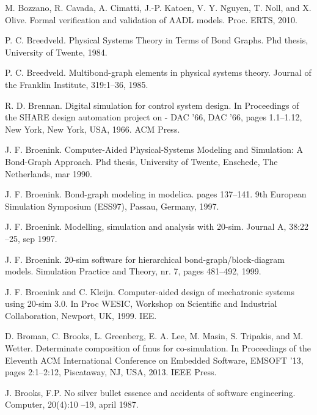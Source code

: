 \begin{description}[style=nextline,leftmargin=12mm,labelwidth=10mm,font=\normalfont]
\item[{[42]}] M. Bozzano, R. Cavada, A. Cimatti, J.-P. Katoen, V. Y. Nguyen, T. Noll, and X. Olive. Formal verification and validation of AADL models. Proc. ERTS, 2010.

\item[{[43]}] P. C. Breedveld. Physical Systems Theory in Terms of Bond Graphs. Phd thesis, University of Twente, 1984.

\item[{[44]}] P. C. Breedveld. Multibond-graph elements in physical systems theory. Journal of the Franklin Institute, 319:1–36, 1985.

\item[{[45]}] R. D. Brennan. Digital simulation for control system design. In Proceedings of the SHARE design automation project on - DAC ’66, DAC ’66, pages 1.1–1.12, New York, New York, USA, 1966. ACM Press.

\item[{[46]}] J. F. Broenink. Computer-Aided Physical-Systems Modeling and Simulation: A Bond-Graph Approach. Phd thesis, University of Twente, Enschede, The Netherlands, mar 1990.

\item[{[47]}] J. F. Broenink. Bond-graph modeling in modelica. pages 137–141. 9th European Simulation Symposium (ESS97), Passau, Germany, 1997.

\item[{[48]}] J. F. Broenink. Modelling, simulation and analysis with 20-sim. Journal A, 38:22 –25, sep 1997.

\item[{[49]}] J. F. Broenink. 20-sim software for hierarchical bond-graph/block-diagram models. Simulation Practice and Theory, nr. 7, pages 481–492, 1999.

\item[{[50]}] J. F. Broenink and C. Kleijn. Computer-aided design of mechatronic systems using 20-sim 3.0. In Proc WESIC, Workshop on Scientific and Industrial Collaboration, Newport, UK, 1999. IEE.

\item[{[51]}] D. Broman, C. Brooks, L. Greenberg, E. A. Lee, M. Masin, S. Tripakis, and M. Wetter. Determinate composition of fmus for co-simulation. In Proceedings of the Eleventh ACM International Conference on Embedded Software, EMSOFT ’13, pages 2:1–2:12, Piscataway, NJ, USA, 2013. IEEE Press.

\item[{[52]}] J. Brooks, F.P. No silver bullet essence and accidents of software engineering. Computer, 20(4):10 –19, april 1987.


\end{description}
